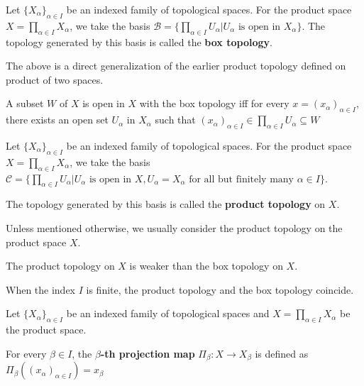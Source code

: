 \begin{defn}
    Let $\{ X_\alpha \}_{\alpha \in I}$ be an indexed family of topological spaces. For the product space $X =  \prod_{\alpha \in I} X_\alpha$, we take the basis $\mathscr{B} = \{ \prod_{\alpha \in I} U_\alpha | U_\alpha \text{ is open in } X_\alpha \}$. The topology generated by this basis is called the \textbf{box topology}. 
\end{defn}

\begin{note}
    The above is a direct generalization of the earlier product topology defined on product of two spaces.
\end{note}

\begin{thm}
    A subset $W$ of $X$ is open in $X$ with the box topology iff for every $x = (x_\alpha)_{\alpha \in I}$, there exists an open set $U_\alpha$ in $X_\alpha$ such that $(x_\alpha)_{\alpha \in I} \in \prod_{\alpha \in I} U_\alpha \subseteq W$
\end{thm}

\begin{defn}
Let $\{ X_\alpha \}_{\alpha \in I}$ be an indexed family of topological spaces. For the product space $X =  \prod_{\alpha \in I} X_\alpha$, we take the basis $\mathscr{C} = \{ \prod_{\alpha \in I} U_\alpha | U_\alpha \text{ is open in } X, U_\alpha = X_\alpha \text{ for all but finitely many } \alpha \in I \}$. 

    The topology generated by this basis is called the \textbf{product topology} on $X$.
\end{defn}

\begin{note}
    Unless mentioned otherwise, we usually consider the product topology on the product space $X$.
\end{note}

\begin{thm}
    The product topology on $X$ is weaker than the box topology on $X$.
\end{thm}

\begin{note}
    When the index $I$ is finite, the product topology and the box topology coincide.
\end{note}

\begin{defn}
    Let $\{ X_\alpha \}_{\alpha \in I}$ be an indexed family of topological spaces and $X = \prod_{\alpha \in I} X_\alpha$ be the product space. 

    For every $\beta \in I$, the \textbf{$\beta$-th projection map} $\Pi_\beta: X \to X_\beta$ is defined as $\Pi_\beta ( (x_\alpha)_{\alpha \in I} ) = x_\beta$
\end{defn}

